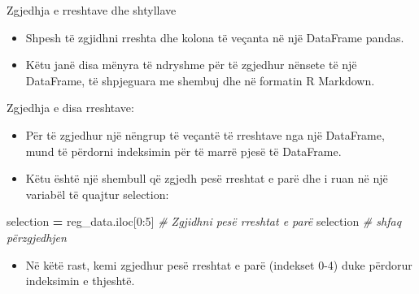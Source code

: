 \documentclass[
  ignorenonframetext,
]{beamer}
\newenvironment{Shaded}{\begin{snugshade}}{\end{snugshade}}
\newcommand{\CommentTok}[1]{\textcolor[rgb]{0.56,0.35,0.01}{\textit{#1}}}
\newcommand{\DecValTok}[1]{\textcolor[rgb]{0.00,0.00,0.81}{#1}}
\newcommand{\NormalTok}[1]{#1}
\newcommand{\OperatorTok}[1]{\textcolor[rgb]{0.81,0.36,0.00}{\textbf{#1}}}
\providecommand{\tightlist}{%
  \setlength{\itemsep}{0pt}\setlength{\parskip}{0pt}}
\begin{document}
\begin{frame}{Zgjedhja e rreshtave dhe shtyllave}
\protect\hypertarget{zgjedhja-e-rreshtave-dhe-shtyllave-1}{}
\begin{itemize}
\item
  Shpesh të zgjidhni rreshta dhe kolona të veçanta në një DataFrame
  pandas.
\item
  Këtu janë disa mënyra të ndryshme për të zgjedhur nënsete të një
  DataFrame, të shpjeguara me shembuj dhe në formatin R Markdown.
\end{itemize}
\end{frame}

\begin{frame}[fragile]{Zgjedhja e disa rreshtave:}
\protect\hypertarget{zgjedhja-e-disa-rreshtave}{}
\begin{itemize}
\item
  Për të zgjedhur një nëngrup të veçantë të rreshtave nga një DataFrame,
  mund të përdorni indeksimin për të marrë pjesë të DataFrame.
\item
  Këtu është një shembull që zgjedh pesë rreshtat e parë dhe i ruan në
  një variabël të quajtur selection:
\end{itemize}

\begin{Shaded}
\begin{Highlighting}[]
\NormalTok{selection }\OperatorTok{=}\NormalTok{ reg\_data.iloc[}\DecValTok{0}\NormalTok{:}\DecValTok{5}\NormalTok{]  }\CommentTok{\# Zgjidhni pesë rreshtat e parë}
\NormalTok{selection  }\CommentTok{\# shfaq përzgjedhjen}
\end{Highlighting}
\end{Shaded}

\begin{itemize}
\tightlist
\item
  Në këtë rast, kemi zgjedhur pesë rreshtat e parë (indekset 0-4) duke
  përdorur indeksimin e thjeshtë.
\end{itemize}
\end{frame}
\end{document}
